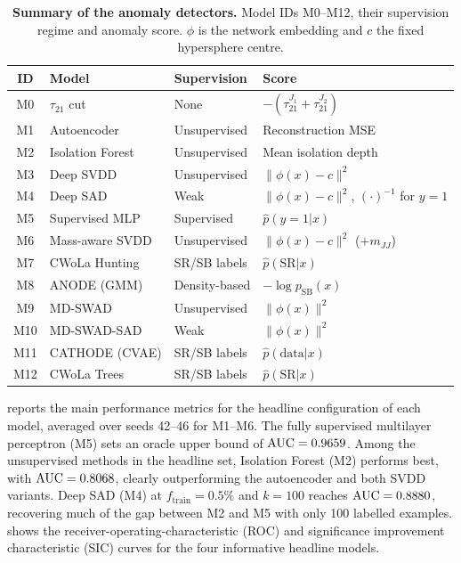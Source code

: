 \documentclass[11pt,a4paper]{article}
\newcommand{\subhead}[1]{\par\vspace{4pt}{\sffamily\bfseries\normalsize #1}\par\nopagebreak\vspace{1pt}}
\newcommand{\ftrain}{f_{\mathrm{train}}}
\newcommand{\klabels}{k}
\newcommand{\auc}{\mathrm{AUC}}
\newcommand{\mjj}{m_{JJ}}
\newcommand{\tautwo}{\tau_{21}}
\begin{document}
\begin{table}[t]
\centering
\caption{\textbf{Summary of the anomaly detectors.} Model IDs M0--M12, their supervision
regime and anomaly score. $\phi$ is the network embedding and $c$ the fixed hypersphere centre.}
\label{tab:models}
\small
\setlength{\tabcolsep}{4pt}
\begin{tabular}{clll}
\toprule
ID & Model & Supervision & Score \\
\midrule
M0 & $\tautwo$ cut & None & $-(\tautwo^{J_1}+\tautwo^{J_2})$ \\
M1 & Autoencoder & Unsupervised & Reconstruction MSE \\
M2 & Isolation Forest & Unsupervised & Mean isolation depth \\
M3 & Deep SVDD & Unsupervised & $\|\phi(x)-c\|^2$ \\
M4 & Deep SAD & Weak & $\|\phi(x)-c\|^2$, $(\cdot)^{-1}$ for $y{=}1$ \\
M5 & Supervised MLP & Supervised & $\hat{p}(y{=}1|x)$ \\
M6 & Mass-aware SVDD & Unsupervised & $\|\phi(x)-c\|^2$ ($+\mjj$) \\
M7 & CWoLa Hunting & SR/SB labels & $\hat{p}(\mathrm{SR}|x)$ \\
M8 & ANODE (GMM) & Density-based & $-\log p_{\mathrm{SB}}(x)$ \\
M9 & MD-SWAD & Unsupervised & $\|\phi(x)\|^2$ \\
M10 & MD-SWAD-SAD & Weak & $\|\phi(x)\|^2$ \\
M11 & CATHODE (CVAE) & SR/SB labels & $\hat{p}(\mathrm{data}|x)$ \\
M12 & CWoLa Trees & SR/SB labels & $\hat{p}(\mathrm{SR}|x)$ \\
\bottomrule
\end{tabular}
\end{table}

\subhead{Headline comparison}
 reports the main performance metrics for the
headline configuration of each model, averaged over seeds 42--46 for M1--M6.
The fully supervised multilayer perceptron (M5) sets an oracle upper bound of
$\auc = \SupMean$. Among the unsupervised methods in the headline set, Isolation Forest\cite{Liu2008} (M2)
performs best, with $\auc = \IFMean$, clearly outperforming the autoencoder
and both SVDD variants. Deep SAD (M4) at $\ftrain = 0.5\%$ and
$\klabels = 100$ reaches $\auc = \SADMean$, recovering much of
the gap between M2 and M5 with only 100 labelled examples.
 shows the receiver-operating-characteristic (ROC) and significance
improvement characteristic (SIC) curves for the four informative headline
models.
\end{document}
